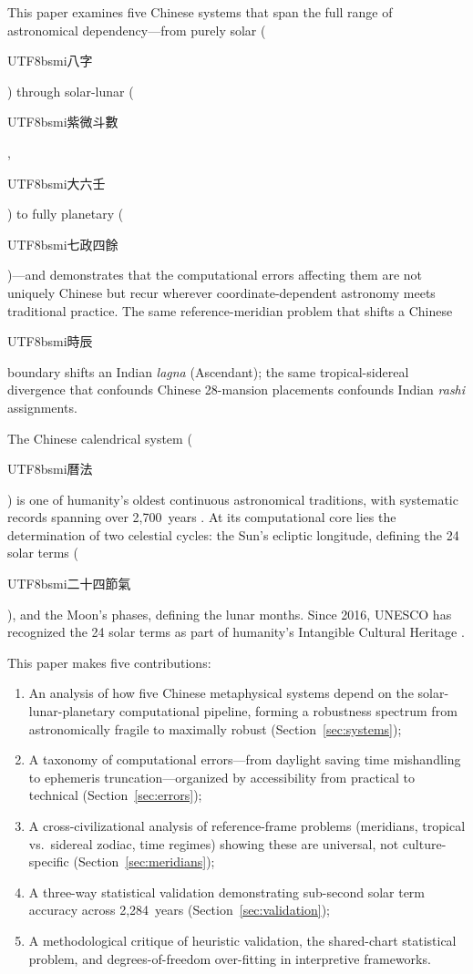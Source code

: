 \documentclass[10pt,a4paper]{article}
\newcommand{\zh}[1]{\begin{CJK}{UTF8}{bsmi}#1\end{CJK}}
\begin{document}
This paper examines five Chinese systems that span the full range of
astronomical dependency---from purely solar (\zh{八字}) through
solar-lunar (\zh{紫微斗數}, \zh{大六壬}) to fully planetary
(\zh{七政四餘})---and demonstrates that the computational errors
affecting them are not uniquely Chinese but recur wherever
coordinate-dependent astronomy meets traditional practice.  The same
reference-meridian problem that shifts a Chinese \zh{時辰} boundary
shifts an Indian \textit{lagna} (Ascendant); the same
tropical-sidereal divergence that confounds Chinese 28-mansion
placements confounds Indian \textit{rashi} assignments.

The Chinese calendrical system (\zh{曆法}) is one of humanity's oldest
continuous astronomical traditions, with systematic records spanning over
2,700~years \cite{stephenson2016}. At its computational core lies the
determination of two celestial cycles: the Sun's ecliptic longitude,
defining the 24 solar terms (\zh{二十四節氣}), and the Moon's phases,
defining the lunar months.  Since 2016, UNESCO has recognized the 24 solar
terms as part of humanity's Intangible Cultural Heritage \cite{unesco2016}.

This paper makes five contributions:
\begin{enumerate}[label=(\roman*)]
  \item An analysis of how five Chinese metaphysical systems depend on
        the solar-lunar-planetary computational pipeline, forming a
        robustness spectrum from astronomically fragile to maximally
        robust (Section~\ref{sec:systems});
  \item A taxonomy of computational errors---from daylight saving time
        mishandling to ephemeris truncation---organized by accessibility
        from practical to technical
        (Section~\ref{sec:errors});
  \item A cross-civilizational analysis of reference-frame problems
        (meridians, tropical vs.\ sidereal zodiac, time regimes) showing
        these are universal, not culture-specific
        (Section~\ref{sec:meridians});
  \item A three-way statistical validation demonstrating sub-second solar
        term accuracy across 2,284~years (Section~\ref{sec:validation});
  \item A methodological critique of heuristic validation, the
        shared-chart statistical problem, and degrees-of-freedom
        over-fitting in interpretive frameworks.
\end{enumerate}
\end{document}
